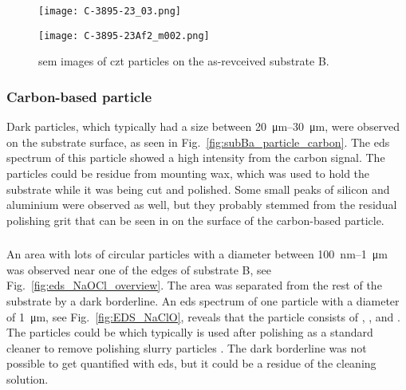 \begin{figure}[htbp]
    \centering
          \begin{minipage}[c]{0.49\linewidth}
            \centering
            \texttt{[image: C-3895-23\_03.png]}
          \end{minipage}
          \hfill
          \begin{minipage}[c]{0.49\linewidth}
            \centering
            \texttt{[image: C-3895-23Af2\_m002.png]}
          \end{minipage}
        \caption[\Ac{sem} images of \ac{czt} particles on as-revceived substrate B.]{\Ac{sem} images of \ac{czt} particles on the as-revceived substrate B.}\label{fig:SEM_B_particulates}  
\end{figure}


\subsubsection{Carbon-based particle}
Dark particles, which typically had a size between \SIrange{20}{30}{\micro\metre}, were observed on the substrate surface, as seen in Fig.~\ref{fig:subBa_particle_carbon}. The \ac{eds} spectrum of this particle showed a high intensity from the carbon signal. The particles could be residue from mounting wax, which was used to hold the substrate while it was being cut and polished. Some small peaks of silicon and aluminium were observed as well, but they probably stemmed from the residual polishing grit that can be seen in on the surface of the carbon-based particle.

\subsubsection{}
An area with lots of circular particles with a diameter between \SI{100}{\nano\metre}--\SI{1}{\micro\metre} was observed near one of the edges of substrate B, see Fig.~\ref{fig:eds_NaOCl_overview}. The area was separated from the rest of the substrate by a dark borderline. An \ac{eds} spectrum of one particle with a diameter of \SI{1}{\micro\metre}, see Fig.~\ref{fig:EDS_NaClO}, reveals that the particle consists of , , and . The particles could be  which typically is used after polishing as a standard cleaner to remove polishing slurry particles \citep{benson2015as-received}. The dark borderline was not possible to get quantified with \ac{eds}, but it could be a residue of the cleaning solution.

